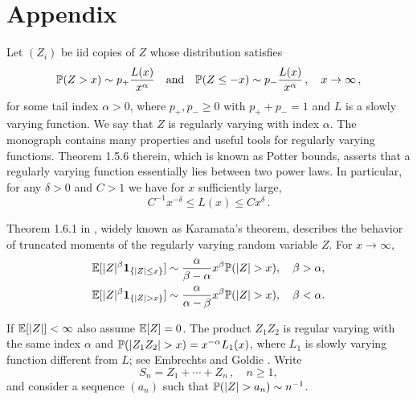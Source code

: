 
\section{Appendix}\label{appendix:A}

Let $(Z_i)$ be iid copies of $Z$ whose distribution satisfies 
\begin{equation*}
\mathbb{P}(Z>x)\sim p_+ \dfrac{L(x)}{x^{\alpha}}\quad\mbox{and}\quad  \mathbb{P}(Z\le -x)\sim p_-
\dfrac{L(x)}{x^{\alpha}} \,,\quad x \to \infty\,,
\end{equation*}
 for some tail index $\alpha>0$,
where $p_+,p_-\ge 0$ with $p_++p_-=1$ and $L$ is a slowly varying function. We say that $Z$ is regularly varying with index $\alpha$. The monograph \cite{bingham:goldie:teugels:1987} contains many properties and useful tools for regularly varying functions. Theorem 1.5.6 therein, which is known as Potter bounds, asserts that a regularly varying function essentially lies between two power laws. In particular,  
for any $\delta>0$ and $C>1$ we have for $x$ sufficiently large,
\begin{equation*}
C^{-1} x^{-\delta} \le L(x) \le C x^{\delta}\,.
\end{equation*}

Theorem 1.6.1 in \cite{bingham:goldie:teugels:1987}, widely known as Karamata's theorem, describes the behavior of truncated moments of the regularly varying random variable $Z$. For $x\to \infty$,
\begin{equation*}
\begin{split}
\E[|Z|^\beta \1_{\{|Z|\leq x\}}] &\sim \frac{\alpha}{\beta -\alpha} x^\beta \P(|Z|>x), \quad \beta>\alpha,\\
\E[|Z|^\beta \1_{\{|Z| > x\}}] &\sim \frac{\alpha}{\alpha-\beta} x^\beta \P(|Z|>x), \quad \beta<\alpha.
\end{split}
\end{equation*}

If $\mathbb{E}[|Z|]<\infty$ also assume $\mathbb{E}[Z]=0$. The product $Z_1Z_2$ is regular varying with the same index $\alpha$ and $\P(|Z_1Z_2|>x)= x^{-\alpha} L_1(x)$, where $L_1$ is slowly varying function different from $L$;
see Embrechts and Goldie \cite{embrechts:goldie:1980}.
Write
\begin{equation*}
S_n=Z_1+\cdots +Z_n\,,\quad n\ge 1,
\end{equation*} and consider a sequence $(a_n)$ such that $\P(|Z|>a_n)\sim n^{-1}$.

